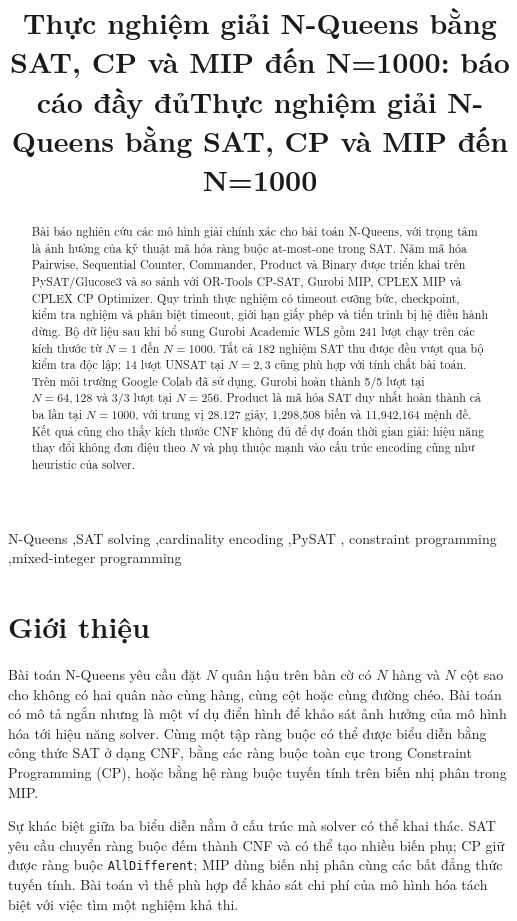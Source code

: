 \documentclass[a4paper,fleqn]{cas-sc}
\title[mode=title]{Thực nghiệm giải N-Queens bằng SAT, CP và MIP đến N=1000: báo cáo đầy đủ}
\title[mode=title]{Thực nghiệm giải N-Queens bằng SAT, CP và MIP đến N=1000}
\author[1]{\StudentName}
\begin{document}
\begin{abstract}
Bài báo nghiên cứu các mô hình giải chính xác cho bài toán N-Queens, với trọng
tâm là ảnh hưởng của kỹ thuật mã hóa ràng buộc at-most-one trong SAT. Năm mã
hóa Pairwise, Sequential Counter, Commander, Product và Binary được triển khai
trên PySAT/Glucose3 và so sánh với OR-Tools CP-SAT, Gurobi MIP, CPLEX MIP và
CPLEX CP Optimizer. Quy trình thực nghiệm có timeout cưỡng bức, checkpoint,
kiểm tra nghiệm và phân biệt timeout, giới hạn giấy phép và tiến trình bị hệ
điều hành dừng. Bộ dữ liệu sau khi bổ sung Gurobi Academic WLS gồm 241 lượt
chạy trên các kích thước từ $N=1$ đến $N=1000$. Tất cả 182 nghiệm SAT thu được
đều vượt qua bộ kiểm tra độc lập; 14
lượt UNSAT tại $N=2,3$ cũng phù hợp với tính chất bài toán. Trên môi trường
Google Colab đã sử dụng, Gurobi hoàn thành 5/5 lượt tại $N=64,128$ và 3/3 lượt
tại $N=256$. Product là mã hóa SAT duy nhất hoàn thành cả ba lần tại $N=1000$,
với trung vị 28.127 giây, 1,298,508 biến và 11,942,164 mệnh đề.
Kết quả cũng cho thấy kích thước CNF không đủ để dự đoán thời gian giải: hiệu
năng thay đổi không đơn điệu theo $N$ và phụ thuộc mạnh vào cấu trúc encoding
cũng như heuristic của solver.
\end{abstract}

\begin{keywords}
N-Queens \sep SAT solving \sep cardinality encoding \sep PySAT \sep
constraint programming \sep mixed-integer programming
\end{keywords}

\maketitle

\section{Giới thiệu}

Bài toán N-Queens yêu cầu đặt $N$ quân hậu trên bàn cờ có $N$ hàng và $N$ cột sao cho
không có hai quân nào cùng hàng, cùng cột hoặc cùng đường chéo. Bài toán có mô
tả ngắn nhưng là một ví dụ điển hình để khảo sát ảnh hưởng của mô hình hóa tới
hiệu năng solver. Cùng một tập ràng buộc có thể được biểu diễn bằng công thức
SAT ở dạng CNF, bằng các ràng buộc toàn cục trong Constraint Programming (CP),
hoặc bằng hệ ràng buộc tuyến tính trên biến nhị phân trong MIP.

Sự khác biệt giữa ba biểu diễn nằm ở cấu trúc mà solver có thể khai thác.
SAT yêu cầu chuyển ràng buộc đếm thành CNF và có thể tạo nhiều biến phụ; CP
giữ được ràng buộc \texttt{AllDifferent}; MIP dùng biến nhị phân cùng các bất
đẳng thức tuyến tính. Bài toán vì thế phù hợp để khảo sát chi phí của mô hình
hóa tách biệt với việc tìm một nghiệm khả thi.
\end{document}
